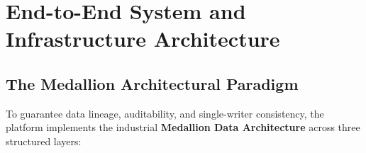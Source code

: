 \documentclass[11pt,a4paper,oneside]{article}
\begin{document}
\newpage

\section{End-to-End System and Infrastructure Architecture}

\subsection{The Medallion Architectural Paradigm}
To guarantee data lineage, auditability, and single-writer consistency, the platform implements the industrial \textbf{Medallion Data Architecture} across three structured layers:
\end{document}
